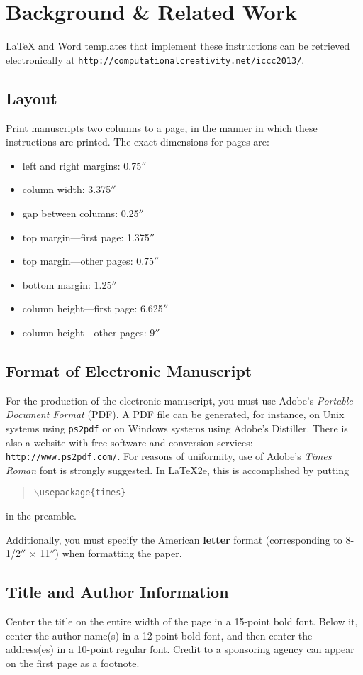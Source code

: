 \documentclass[letterpaper]{article}
\begin{document}
\section{Background \& Related Work}
\LaTeX{} and Word templates that implement these instructions
can be retrieved electronically at {\small \tt http://computationalcreativity.net/iccc2013/}.

\subsection{Layout}
Print manuscripts two columns to a page, in the manner in which these
instructions are printed. The exact dimensions for pages are:
\begin{itemize}
\item left and right margins: 0.75$''$
\item column width: 3.375$''$
\item gap between columns: 0.25$''$
\item top margin---first page: 1.375$''$
\item top margin---other pages: 0.75$''$
\item bottom margin: 1.25$''$
\item column height---first page: 6.625$''$
\item column height---other pages: 9$''$
\end{itemize}

\subsection{Format of Electronic Manuscript}
For the production of the electronic manuscript, you must use Adobe's
{\em Portable Document Format} (PDF). A PDF file can be generated, for
instance, on Unix systems using {\tt ps2pdf} or on Windows systems
using Adobe's Distiller. There is also a website with free software
and conversion services: {\tt http://www.ps2pdf.com/}. For reasons of
uniformity, use of Adobe's {\em Times Roman} font is strongly suggested. In
\LaTeX2e{}, this is accomplished by putting
\begin{quote} 
\mbox{\tt $\backslash$usepackage\{times\}}
\end{quote}
in the preamble.
  
Additionally, you must specify the American {\bf
letter} format (corresponding to 8-1/2$''$ $\times$ 11$''$) when
formatting the paper.

\subsection{Title and Author Information}
Center the title on the entire width of the page in a 15-point bold
font. Below it, center the author name(s) in a 12-point bold font, and
then center the address(es) in a 10-point regular font. Credit to a
sponsoring agency can appear on the first page as a footnote.
\end{document}
